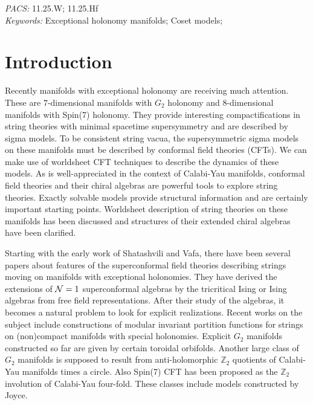 \documentclass[a4paper,12pt]{article}
\numberwithin{equation}{section}
\newcommand{\Zb}{\mathbb{Z}}
\newcommand{\Ncal}{{\cal N}}
\newcommand{\Spin}[1]{{\rm Spin}(#1)}
\begin{document}
\vspace{5mm}
\noindent
{\it PACS:} 11.25.W; 11.25.Hf\\
{\it Keywords:} Exceptional holonomy manifolds; Coset models;
\newpage

\section{Introduction}
Recently manifolds with exceptional holonomy are receiving much 
attention. These are $7$-dimensional manifolds with $G_2$ holonomy and 
$8$-dimensional manifolds with \Spin 7 holonomy. They provide 
interesting compactifications in string theories with minimal spacetime 
supersymmetry and are described by sigma models. To be consistent string 
vacua, the supersymmetric sigma models on these manifolds must be 
described by conformal field theories (CFTs). We can make use of 
worldsheet CFT techniques to describe the dynamics of these models. As 
is well-appreciated in the context of Calabi-Yau manifolds, conformal 
field theories and their chiral algebras are powerful tools to explore 
string theories. Exactly solvable models provide structural information 
and are certainly important starting points. Worldsheet description of 
string theories on these manifolds has been discussed and structures of 
their extended chiral algebras have been clarified.


Starting with the early work of Shatashvili and 
Vafa\cite{Shatashvili:1994zw}, there have been several papers about 
features of the superconformal field theories describing strings moving 
on manifolds with exceptional 
holonomies\cite{Figueroa-O'Farrill:1997hm,Gepner:2001px,Eguchi:2001xa,%
Sugiyama:2001qh,Blumenhagen:2001jb,Roiban:2001cp,Eguchi:2001ip,%
Blumenhagen:2001qx, Noyvert:2002mc,Roiban:2002iv,Naka:2002}.  They have derived 
the extensions of $\Ncal=1$ superconformal algebras by the tricritical 
Ising or Ising algebras from free field representations.  After their 
study of the algebras, it becomes a natural problem to look for explicit 
realizations.  Recent works on the subject include constructions of 
modular invariant partition functions for strings on (non)compact 
manifolds with special holonomies.  Explicit $G_2$ manifolds constructed 
so far are given by certain toroidal orbifolds.  Another large class 
of $G_2$ manifolds is supposed to result from anti-holomorphic 
$\Zb_2$ quotients of Calabi-Yau manifolds times a circle.  Also \Spin 7 
CFT has been proposed as the $\Zb_2$ involution of Calabi-Yau four-fold. 
These classes include models constructed by 
Joyce\cite{Joyce1,Joyce2,Joyce3}.
\end{document}
